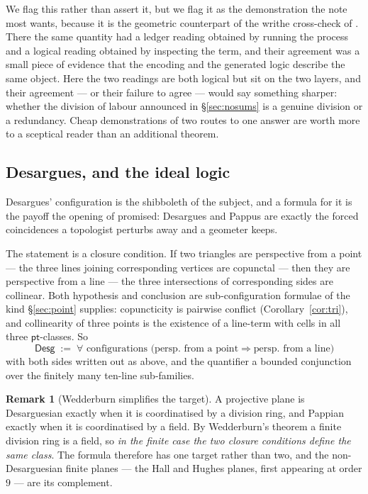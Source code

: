 \documentclass[11pt]{article}
\theoremstyle{plain}
\theoremstyle{definition}
\newtheorem{remark}[theorem]{Remark}
\newcommand{\pt}{\mathsf{pt}}
\newcommand{\Desg}{\mathsf{Desg}}
\begin{document}
We flag this rather than assert it, but we flag it as the demonstration the note most wants,
because it is the geometric counterpart of the writhe cross-check of \cite[\S4.5]{Classifier}. There
the same quantity had a ledger reading obtained by running the process and a logical reading
obtained by inspecting the term, and their agreement was a small piece of evidence that the
encoding and the generated logic describe the same object. Here the two readings are both logical
but sit on the two layers, and their agreement --- or their failure to agree --- would say something
sharper: whether the division of labour announced in \S\ref{sec:nosums} is a genuine division or a
redundancy. Cheap demonstrations of two routes to one answer are worth more to a sceptical reader
than an additional theorem.

\subsection{Desargues, and the ideal logic}

Desargues' configuration is the shibboleth of the subject, and a formula for it is the payoff the
opening of \cite{Geometry} promised: Desargues and Pappus are exactly the forced coincidences a
topologist perturbs away and a geometer keeps.

The statement is a closure condition. If two triangles are perspective from a point --- the three
lines joining corresponding vertices are copunctal --- then they are perspective from a line --- the
three intersections of corresponding sides are collinear. Both hypothesis and conclusion are
sub-configuration formulae of the kind \S\ref{sec:point} supplies: copuncticity is pairwise
conflict (Corollary~\ref{cor:tri}), and collinearity of three points is the existence of a
line-term with cells in all three $\pt$-classes. So
\[
\Desg \;:=\; \forall \text{ configurations } \bigl( \text{persp.\ from a point} \Rightarrow
\text{persp.\ from a line} \bigr)
\]
with both sides written out as above, and the quantifier a bounded conjunction over the finitely
many ten-line sub-families.

\begin{remark}[Wedderburn simplifies the target]
A projective plane is Desarguesian exactly when it is coordinatised by a division ring, and
Pappian exactly when it is coordinatised by a field. By Wedderburn's theorem a finite division ring
is a field, so \emph{in the finite case the two closure conditions define the same class}. The
formula therefore has one target rather than two, and the non-Desarguesian finite planes --- the
Hall and Hughes planes, first appearing at order $9$ --- are its complement.
\end{remark}
\end{document}
